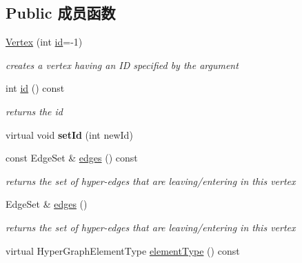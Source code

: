 \subsection*{Public 成员函数}
\begin{DoxyCompactItemize}
\item 
\hypertarget{classg2o_1_1HyperGraph_1_1Vertex_a7f2e986815608e5ac4a44671ed9794ae}{\hyperlink{classg2o_1_1HyperGraph_1_1Vertex_a7f2e986815608e5ac4a44671ed9794ae}{Vertex} (int \hyperlink{classg2o_1_1HyperGraph_1_1Vertex_ad76b71c368b71971ac5affb5d57183d3}{id}=-\/1)}\label{classg2o_1_1HyperGraph_1_1Vertex_a7f2e986815608e5ac4a44671ed9794ae}

\begin{DoxyCompactList}\small\item\em creates a vertex having an I\-D specified by the argument \end{DoxyCompactList}\item 
\hypertarget{classg2o_1_1HyperGraph_1_1Vertex_ad76b71c368b71971ac5affb5d57183d3}{int \hyperlink{classg2o_1_1HyperGraph_1_1Vertex_ad76b71c368b71971ac5affb5d57183d3}{id} () const }\label{classg2o_1_1HyperGraph_1_1Vertex_ad76b71c368b71971ac5affb5d57183d3}

\begin{DoxyCompactList}\small\item\em returns the id \end{DoxyCompactList}\item 
\hypertarget{classg2o_1_1HyperGraph_1_1Vertex_ac861d25447d8ff167d23c45458f7382f}{virtual void {\bfseries set\-Id} (int new\-Id)}\label{classg2o_1_1HyperGraph_1_1Vertex_ac861d25447d8ff167d23c45458f7382f}

\item 
\hypertarget{classg2o_1_1HyperGraph_1_1Vertex_a0805a5575511327262c89585f1953b8e}{const Edge\-Set \& \hyperlink{classg2o_1_1HyperGraph_1_1Vertex_a0805a5575511327262c89585f1953b8e}{edges} () const }\label{classg2o_1_1HyperGraph_1_1Vertex_a0805a5575511327262c89585f1953b8e}

\begin{DoxyCompactList}\small\item\em returns the set of hyper-\/edges that are leaving/entering in this vertex \end{DoxyCompactList}\item 
\hypertarget{classg2o_1_1HyperGraph_1_1Vertex_a35cbf4ea796797bb5d9c35a41454e8fb}{Edge\-Set \& \hyperlink{classg2o_1_1HyperGraph_1_1Vertex_a35cbf4ea796797bb5d9c35a41454e8fb}{edges} ()}\label{classg2o_1_1HyperGraph_1_1Vertex_a35cbf4ea796797bb5d9c35a41454e8fb}

\begin{DoxyCompactList}\small\item\em returns the set of hyper-\/edges that are leaving/entering in this vertex \end{DoxyCompactList}\item 
virtual Hyper\-Graph\-Element\-Type \hyperlink{classg2o_1_1HyperGraph_1_1Vertex_a0f7f29e5924b61b68b8e19ed142b68d0}{element\-Type} () const 
\end{DoxyCompactItemize}
